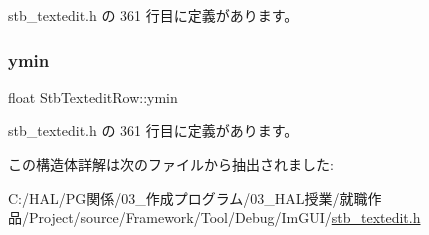  stb\+\_\+textedit.\+h の 361 行目に定義があります。

\mbox{\label{struct_stb_textedit_row_a707d331bd9dc99d64c81f71106b75eed}} 
\subsubsection{\texorpdfstring{ymin}{ymin}}
{\footnotesize\ttfamily float Stb\+Textedit\+Row\+::ymin}



 stb\+\_\+textedit.\+h の 361 行目に定義があります。



この構造体詳解は次のファイルから抽出されました\+:\begin{DoxyCompactItemize}
\item 
C\+:/\+H\+A\+L/\+P\+G関係/03\+\_\+作成プログラム/03\+\_\+\+H\+A\+L授業/就職作品/\+Project/source/\+Framework/\+Tool/\+Debug/\+Im\+G\+U\+I/\mbox{\hyperlink{stb__textedit_8h}{stb\+\_\+textedit.\+h}}\end{DoxyCompactItemize}
